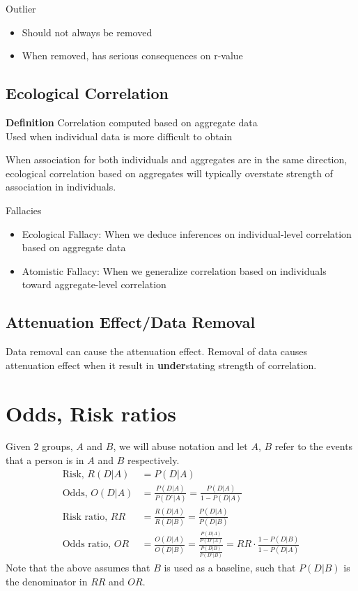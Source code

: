 \documentclass{article}
\begin{document}
Outlier
\begin{itemize}
	\item Should not always be removed
	\item When removed, has serious consequences on r-value
\end{itemize}

\subsection{Ecological Correlation}
\textbf{Definition} Correlation computed based on aggregate data\\
Used when individual data is more difficult to obtain

When association for both individuals and aggregates are in the same direction, ecological correlation based on aggregates will typically overstate strength of association in individuals.

Fallacies
\begin{itemize}
	\item Ecological Fallacy: When we deduce inferences on individual-level correlation based on aggregate data
	\item Atomistic Fallacy: When we generalize correlation based on individuals toward aggregate-level correlation
\end{itemize}

\subsection{Attenuation Effect/Data Removal}
Data removal can cause the attenuation effect. Removal of data causes attenuation effect when it result in \textbf{under}stating strength of correlation.

\section{Odds, Risk ratios}
Given 2 groups, $A$ and $B$, we will abuse notation and let $A$, $B$ refer to the events that a person is in $A$ and $B$ respectively.
\begin{align*}
	\text{Risk, } R(D|A)&=P(D|A)\\
	\text{Odds, } O(D|A)&=\frac{P(D|A)}{P(D^c|A)}=\frac{P(D|A)}{1-P(D|A)}\\
	\text{Risk ratio, }RR&=\frac{R(D|A)}{R(D|B)}=\frac{P(D|A)}{P(D|B)}\\
	\text{Odds ratio, }OR&=\frac{O(D|A)}{O(D|B)}=\frac{\frac{P(D|A)}{P(D^c|A)}}{\frac{P(D|B)}{P(D^c|B)}}=RR\cdot \frac{1-P(D|B)}{1-P(D|A)}
\end{align*}
Note that the above assumes that $B$ is used as a baseline, such that $P(D|B)$ is the denominator in $RR$ and $OR$.
\end{document}
